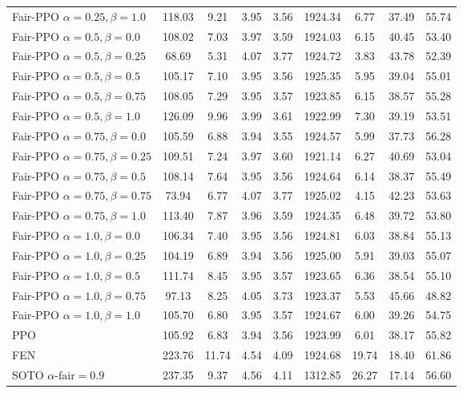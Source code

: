 \begin{table*}
{\begin{tabular}{ l S[table-format=3.2] S[table-format=2.2] S[table-format=1.2] S[table-format=1.2] S[table-format=4.2] S[table-format=2.2] S[table-format=2.2] S[table-format=2.2] }
Fair-PPO $\alpha=0.25, \beta=1.0$ & 118.03 & 9.21 & 3.95 & 3.56 & 1924.34 & 6.77 & 37.49 & 55.74 \\
Fair-PPO $\alpha=0.5, \beta=0.0$ & 108.02 & 7.03 & 3.97 & 3.59 & 1924.03 & 6.15 & 40.45 & 53.40 \\
Fair-PPO $\alpha=0.5, \beta=0.25$ & 68.69 & 5.31 & 4.07 & 3.77 & 1924.72 & 3.83 & 43.78 & 52.39 \\
Fair-PPO $\alpha=0.5, \beta=0.5$ & 105.17 & 7.10 & 3.95 & 3.56 & 1925.35 & 5.95 & 39.04 & 55.01 \\
Fair-PPO $\alpha=0.5, \beta=0.75$ & 108.05 & 7.29 & 3.95 & 3.57 & 1923.85 & 6.15 & 38.57 & 55.28 \\
Fair-PPO $\alpha=0.5, \beta=1.0$ & 126.09 & 9.96 & 3.99 & 3.61 & 1922.99 & 7.30 & 39.19 & 53.51 \\
Fair-PPO $\alpha=0.75, \beta=0.0$ & 105.59 & 6.88 & 3.94 & 3.55 & 1924.57 & 5.99 & 37.73 & 56.28 \\
Fair-PPO $\alpha=0.75, \beta=0.25$ & 109.51 & 7.24 & 3.97 & 3.60 & 1921.14 & 6.27 & 40.69 & 53.04 \\
Fair-PPO $\alpha=0.75, \beta=0.5$ & 108.14 & 7.64 & 3.95 & 3.56 & 1924.64 & 6.14 & 38.37 & 55.49 \\
Fair-PPO $\alpha=0.75, \beta=0.75$ & 73.94 & 6.77 & 4.07 & 3.77 & 1925.02 & 4.15 & 42.23 & 53.63 \\
Fair-PPO $\alpha=0.75, \beta=1.0$ & 113.40 & 7.87 & 3.96 & 3.59 & 1924.35 & 6.48 & 39.72 & 53.80 \\
Fair-PPO $\alpha=1.0, \beta=0.0$ & 106.34 & 7.40 & 3.95 & 3.56 & 1924.81 & 6.03 & 38.84 & 55.13 \\
Fair-PPO $\alpha=1.0, \beta=0.25$ & 104.19 & 6.89 & 3.94 & 3.56 & 1925.00 & 5.91 & 39.03 & 55.07 \\
Fair-PPO $\alpha=1.0, \beta=0.5$ & 111.74 & 8.45 & 3.95 & 3.57 & 1923.65 & 6.36 & 38.54 & 55.10 \\
Fair-PPO $\alpha=1.0, \beta=0.75$ & 97.13 & 8.25 & 4.05 & 3.73 & 1923.37 & 5.53 & 45.66 & 48.82 \\
Fair-PPO $\alpha=1.0, \beta=1.0$ & 105.70 & 6.80 & 3.95 & 3.57 & 1924.67 & 6.00 & 39.26 & 54.75 \\
\midrule
PPO & 105.92 & 6.83 & 3.94 & 3.56 & 1923.99 & 6.01 & 38.17 & 55.82 \\
\midrule
FEN & 223.76 & 11.74 & 4.54 & 4.09 & 1924.68 & 19.74 & 18.40 & 61.86 \\
\midrule
SOTO $\alpha\text{-fair}=0.9$ & 237.35 & 9.37 & 4.56 & 4.11 & 1312.85 & 26.27 & 17.14 & 56.60 \\

\end{tabular}}
\end{table*}
